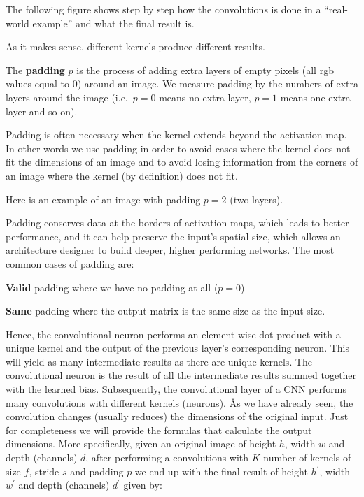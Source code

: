 \ee

\be
The following figure shows step by step how the convolutions is done in a ``real-world example'' and what the final
result is.

\ee

As it makes sense, different kernels produce different results.

\be
{}


\ee

\bd[Padding]
The \textbf{padding} $p$ is the process of adding extra layers of empty pixels (all rgb values equal to 0) around an
image. We measure padding by the numbers of extra layers around the image (i.e.\ $p=0$ means no extra layer, $p=1$
means one extra layer and so on).
\ed

Padding is often necessary when the kernel extends beyond the activation map. In other words we use padding in order
to avoid cases where the kernel does not fit the dimensions of an image and to avoid losing information from the
corners of an image where the kernel (by definition) does not fit.

\be
Here is an example of an image with padding $p=2$ (two layers).

\ee

Padding conserves data at the borders of activation maps, which leads to better performance, and it can help preserve
the input's spatial size, which allows an architecture designer to build deeper, higher performing networks. The most
common cases of padding are:
\bit
\item \textbf{Valid} padding where we have no padding at all ($p=0$)
\item \textbf{Same} padding where the output matrix is the same size as the input size.
\eit

Hence, the convolutional neuron performs an element-wise dot product with a unique kernel and the output of the
previous layer's corresponding neuron. This will yield as many intermediate results as there are unique kernels. The
convolutional neuron is the result of all the intermediate results summed together with the learned bias.
Subsequently, the convolutional layer of a CNN performs many convolutions with different kernels (neurons). \v

As we have already seen, the convolution changes (usually reduces) the dimensions of the original input. Just for
completeness we will provide the formulas that calculate the output dimensions. More specifically, given an original
image of height $h$, width $w$ and depth (channels) $d$, after performing a convolutions with $K$ number of kernels
of size $f$, stride $s$ and padding $p$ we end up with the final result of height $h^\prime$, width $w^\prime$ and
depth (channels) $d^\prime$ given by:

